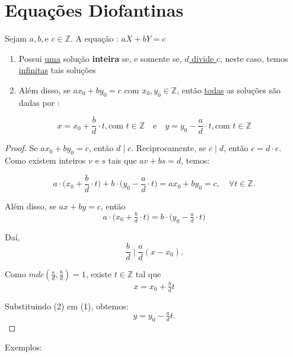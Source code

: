 \vspace{1cm}

\section{Equações Diofantinas}

Sejam $a,b, \text{e } c \in \mathbb{Z}$. A equação : $aX + bY = c$

\begin{enumerate}[label=\roman*., left=0.5cm, align=left, nosep]
    \item Possui \underline{uma} solução \textbf{inteira} se, e somente se, \underline{$d$ divide $c$}, neste caso, temos \underline{infinitas} 
    tais soluções 
    \item Além disso, se $ ax_0 + by_0 = c $ com $x_0,y_0 \in \mathbb{Z}$, então \underline{todas} as soluções são dadas por : 
\end{enumerate}
\[
x = x_0 + \frac{b}{d} \cdot t , \text{com } t \in \mathbb{Z} \quad \text{e} \quad y = y_0 - \frac{a}{d} \cdot t , \text{com } t \in \mathbb{Z}
\]

\begin{proof}

    Se $ax_0 + by_0 = c$, então $d \mid c$. Reciprocamente, se $c \mid d$, então $c = d \cdot e$.
    Como existem inteiros $v$ e $s$ tais que $av + bs = d$, temos:

    \[
    a \cdot \Big(x_0 + \frac{b}{d} \cdot t\Big) + b \cdot \Big(y_0 - \frac{a}{d} \cdot t\Big) 
    = ax_0 + by_0 = c, \quad \forall t \in \mathbb{Z}.
    \]

    Além disso, se $ax + by = c$, então
    \[
    a \cdot \Big(x_0 + \tfrac{b}{d} \cdot t\Big) = b \cdot \Big(y_0 - \tfrac{a}{d} \cdot t\Big) \tag{1}
    \]

    Daí,
    \[
    \frac{b}{d} \mid \frac{a}{d}(x-x_0).
    \]

    Como $mdc\!\left(\tfrac{a}{d}, \tfrac{b}{d}\right) = 1$, existe $t \in \mathbb{Z}$ tal que
    \[
    \boxed{x = x_0 + \tfrac{b}{d}t} \tag{2}
    \]

    Substituindo (2) em (1), obtemos:
    \[
    \boxed{y = y_0 - \tfrac{a}{d}t}.
    \]
\end{proof}

Exemplos:

